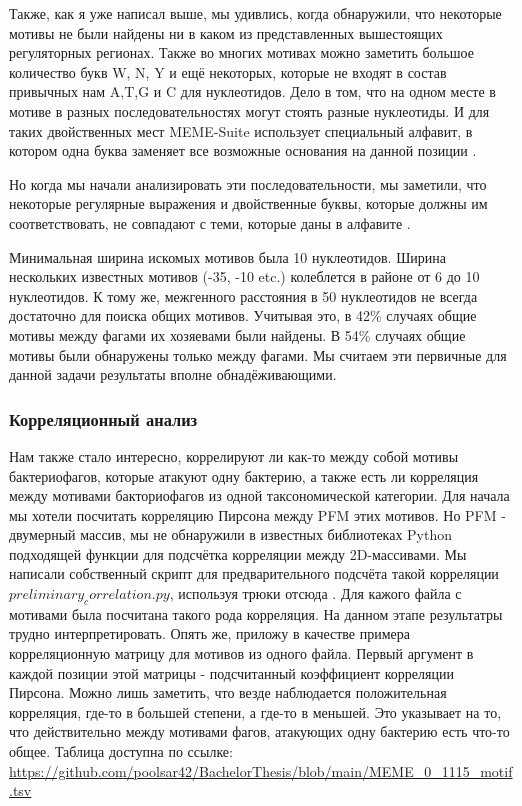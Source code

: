 \documentclass[14pt]{extarticle}
\begin{document}
    \par{Также, как я уже написал выше, мы удивлись, когда обнаружили, что некоторые мотивы не были найдены ни в каком 
    из представленных вышестоящих регуляторных регионах. Также во многих мотивах 
    можно заметить большое количество букв W, N, Y и ещё некоторых, которые не входят в состав привычных нам A,T,G и C 
    для нуклеотидов. Дело в том, что на одном месте в мотиве в разных последовательностях могут стоять разные 
    нуклеотиды. И для таких двойственных мест MEME-Suite использует специальный алфавит, в котором одна буква заменяет 
    все возможные основания на данной позиции \cite{memealphabet}. }
    
    \par{Но когда мы начали анализировать эти последовательности, мы заметили, что некоторые регулярные выражения и 
    двойственные буквы, которые должны им соответствовать, не совпадают с теми, которые даны в алфавите 
    \cite{memealphabet}.}
    
    \par{ Минимальная ширина искомых мотивов была 10 нуклеотидов. Ширина нескольких известных 
    мотивов (-35, -10 etc.) колеблется в районе от 6 до 10 нуклеотидов. К тому же, межгенного расстояния в 
    50 нуклеотидов не всегда достаточно для поиска общих мотивов. Учитывая это, в 42\% случаях общие мотивы между фагами
    их хозяевами были найдены. В 54\% случаях общие мотивы были обнаружены только между фагами. Мы считаем эти первичные
    для данной задачи результаты вполне обнадёживающими.}
    
    \begin{center}
        \item \subsubsection{Корреляционный анализ}
    \end{center}

    \par{Нам также стало интересно, коррелируют ли как-то между собой мотивы бактериофагов, которые атакуют одну 
    бактерию, а также есть ли корреляция между мотивами бакториофагов из одной таксономической категории. Для начала мы 
    хотели посчитать корреляцию Пирсона между PFM этих мотивов. Но PFM - двумерный массив, мы не обнаружили в известных 
    библиотеках Python подходящей функции для подсчётка корреляции между 2D-массивами. Мы написали собственный скрипт 
    для предварительного подсчёта такой корреляции $preliminary_correlation.py$, используя трюки отсюда 
    \cite{stackoverflow}. Для кажого файла с мотивами была посчитана такого рода корреляция. На данном этапе результатры
    трудно интерпретировать. Опять же, приложу в качестве примера корреляционную матрицу для мотивов из одного файла. 
    Первый аргумент в каждой позиции этой матрицы - подсчитанный коэффициент корреляции Пирсона. Можно лишь заметить, 
    что везде наблюдается положительная корреляция, где-то в большей степени, а где-то в меньшей. Это указывает на то, 
    что действительно между мотивами фагов, атакующих одну бактерию есть что-то общее. Таблица доступна по ссылке: 
    \url{https://github.com/poolsar42/BachelorThesis/blob/main/MEME_0_1115_motif.tsv}}
    
\end{document}
